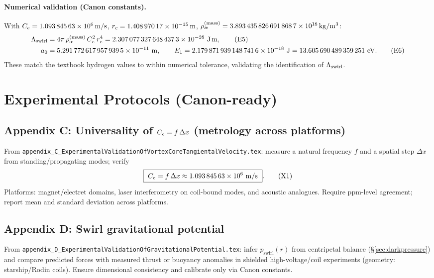 \documentclass[11pt]{article}
\begin{document}
    \paragraph{Numerical validation (Canon constants).}
    With \(\Ce=\num{1.09384563e6}\,\si{m/s}\), \(\rc=\num{1.40897017e-15}\,\si{m}\), \(\aeMass=\num{3.8934358266918687e18}\,\si{kg/m^3}\):
    \begin{align}
        \Lam &= 4\pi\,\aeMass\,\Ce^2\,\rc^4 = \num{2.3070773276484373e-28}\ \si{J.m}, \tag{E5}\\
        a_0 &= \num{5.2917726179579395e-11}\ \si{m},\qquad
        E_1 = \num{2.1798719391487416e-18}\ \si{J} = \num{13.605690489359251}\ \si{eV}. \tag{E6}
    \end{align}
    These match the textbook hydrogen values to within numerical tolerance, validating the identification of \(\Lam\).

    \section{Experimental Protocols (Canon-ready)}
    \label{sec:experiments}
    \subsection{Appendix C: Universality of \(\Ce=f\,\Delta x\) (metrology across platforms)}
    From \texttt{appendix\_C\_ExperimentalValidationOfVortexCoreTangientalVelocity.tex}: measure a natural frequency \(f\) and a spatial step \(\Delta x\) from standing/propagating modes; verify
    \begin{equation}
        \boxed{\ \Ce = f\,\Delta x \approx \num{1.09384563e6}\ \si{m/s}\ } . \tag{X1}
    \end{equation}
    Platforms: magnet/electret domains, laser interferometry on coil-bound modes, and acoustic analogues. Require ppm-level agreement; report mean and standard deviation across platforms.

    \subsection{Appendix D: Swirl gravitational potential}
    From \texttt{appendix\_D\_ExperimentalValidationOfGravitationalPotential.tex}: infer \(p_{\text{swirl}}(r)\) from centripetal balance (\S\ref{sec:darkpressure}) and compare predicted forces with measured thrust or buoyancy anomalies in shielded high-voltage/coil experiments (geometry: starship/Rodin coils). Ensure dimensional consistency and calibrate only via Canon constants.
\end{document}
